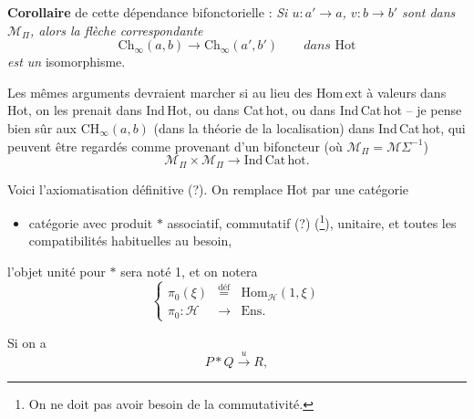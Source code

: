 \documentclass[11pt]{article}
\newcommand{\printedpage}[1]{\marginpar{\footnotesize p.~#1}}
\newcommand{\msp}[1]{\marginpar{\footnotesize [#1]}}
\newcommand{\Ch}{\mathrm{Ch}}
\newcommand{\Hot}{\mathrm{Hot}}
\newcommand{\Hom}{\mathrm{Hom}}
\begin{document}
\textbf{Corollaire} de cette dépendance bifonctorielle : \textit{Si $u : a' \longrightarrow a$, $v : b \longrightarrow b'$ sont dans $\mathcal{M}_\Pi$, alors la flèche correspondante}
\[
\Ch_\infty(a,b) \longrightarrow \Ch_\infty(a',b') \qquad \textit{dans } \Hot
\]
\textit{est un} isomorphisme.

Les mêmes arguments devraient marcher si au lieu des $\Hom\,\mathrm{ext}$ à valeurs dans Hot, on les prenait dans Ind\,Hot, ou dans Cat\,hot, ou dans Ind\,Cat\,hot -- je pense bien sûr aux $\mathrm{CH}_\infty(a,b)$ (dans la théorie de la localisation) dans Ind\,Cat\,hot, qui peuvent être regardés comme provenant d'un bifoncteur (où $\mathcal{M}_\Pi = \mathcal{M}\Sigma^{-1}$)
\[
\mathcal{M}_\Pi \times \mathcal{M}_\Pi \longrightarrow \mathrm{Ind}\,\mathrm{Cat}\,\mathrm{hot}.
\]

\msp{page 5}
Voici l'axiomatisation définitive (?). On remplace Hot par une catégorie

\begin{itemize}[label={$\mathcal{H}$,}]
\item catégorie avec produit $*$ associatif, commutatif (?) (\footnote{On ne doit pas avoir besoin de la commutativité.}), unitaire, et toutes les compatibilités habituelles au besoin,
\end{itemize}

l'objet unité pour $*$ sera noté 1, et on notera
\[
\left\{
\begin{array}{ccc}
\pi_0(\xi) & \overset{\text{déf}}{=} & \Hom_{\mathcal{H}}(1,\xi) \\[1ex]
\pi_0 : \mathcal{H} & \longrightarrow & \mathrm{Ens}.
\end{array}
\right.
\]

Si on a
\[
P * Q \xrightarrow{\ u\ } R,
\]

\printedpage{4}
\end{document}
